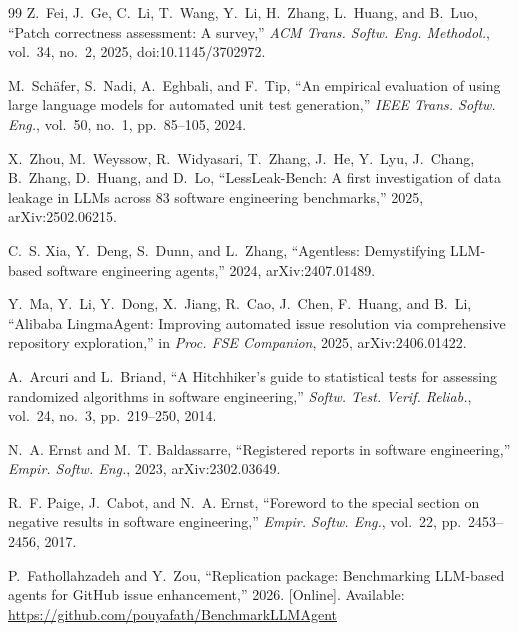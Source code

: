 \documentclass[journal]{IEEEtran}
\begin{document}
\begin{thebibliography}{99}
Z.~Fei, J.~Ge, C.~Li, T.~Wang, Y.~Li, H.~Zhang, L.~Huang, and B.~Luo, ``Patch correctness assessment: A survey,'' \emph{ACM Trans. Softw. Eng. Methodol.}, vol.~34, no.~2, 2025, doi:10.1145/3702972.

M.~Sch{\"a}fer, S.~Nadi, A.~Eghbali, and F.~Tip, ``An empirical evaluation of using large language models for automated unit test generation,'' \emph{IEEE Trans. Softw. Eng.}, vol.~50, no.~1, pp.~85--105, 2024.

X.~Zhou, M.~Weyssow, R.~Widyasari, T.~Zhang, J.~He, Y.~Lyu, J.~Chang, B.~Zhang, D.~Huang, and D.~Lo, ``LessLeak-Bench: A first investigation of data leakage in LLMs across 83 software engineering benchmarks,'' 2025, arXiv:2502.06215.

C.~S. Xia, Y.~Deng, S.~Dunn, and L.~Zhang, ``Agentless: Demystifying LLM-based software engineering agents,'' 2024, arXiv:2407.01489.

Y.~Ma, Y.~Li, Y.~Dong, X.~Jiang, R.~Cao, J.~Chen, F.~Huang, and B.~Li, ``Alibaba LingmaAgent: Improving automated issue resolution via comprehensive repository exploration,'' in \emph{Proc. FSE Companion}, 2025, arXiv:2406.01422.

A.~Arcuri and L.~Briand, ``A Hitchhiker's guide to statistical tests for assessing randomized algorithms in software engineering,'' \emph{Softw. Test. Verif. Reliab.}, vol.~24, no.~3, pp.~219--250, 2014.

N.~A. Ernst and M.~T. Baldassarre, ``Registered reports in software engineering,'' \emph{Empir. Softw. Eng.}, 2023, arXiv:2302.03649.

R.~F. Paige, J.~Cabot, and N.~A. Ernst, ``Foreword to the special section on negative results in software engineering,'' \emph{Empir. Softw. Eng.}, vol.~22, pp.~2453--2456, 2017.

P.~Fathollahzadeh and Y.~Zou, ``Replication package: Benchmarking LLM-based agents for GitHub issue enhancement,'' 2026. [Online]. Available: \url{https://github.com/pouyafath/BenchmarkLLMAgent}

\end{thebibliography}
\end{document}
